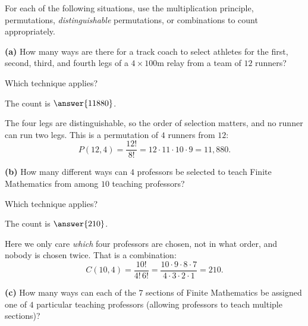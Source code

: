 \documentclass[12pt]{ximera}
\begin{document}
\begin{problem}
For each of the following situations, use the multiplication principle, permutations,
\emph{distinguishable} permutations, or combinations to count appropriately.

\begin{prompt}
\textbf{(a)} How many ways are there for a track coach to select athletes for the
first, second, third, and fourth legs of a $4\times100\text{m}$ relay from a team of
$12$ runners?

Which technique applies?
\begin{multipleChoice}
\end{multipleChoice}

The count is $\answer{11880}$.

\begin{feedback}
The four legs are distinguishable, so the order of selection matters, and no runner
can run two legs. This is a permutation of $4$ runners from $12$:
\[
P(12,4)=\frac{12!}{8!}=12\cdot 11\cdot 10\cdot 9 = 11{,}880.
\]
\end{feedback}
\end{prompt}

\begin{prompt}
\textbf{(b)} How many different ways can $4$ professors be selected to teach Finite
Mathematics from among $10$ teaching professors?

Which technique applies?
\begin{multipleChoice}
\end{multipleChoice}

The count is $\answer{210}$.

\begin{feedback}
Here we only care \emph{which} four professors are chosen, not in what order, and
nobody is chosen twice. That is a combination:
\[
C(10,4)=\frac{10!}{4!\,6!}=\frac{10\cdot 9\cdot 8\cdot 7}{4\cdot 3\cdot 2\cdot 1}=210.
\]
\end{feedback}
\end{prompt}

\begin{prompt}
\textbf{(c)} How many ways can each of the $7$ sections of Finite Mathematics be
assigned one of $4$ particular teaching professors (allowing professors to teach
multiple sections)?


\end{prompt}
\end{problem}
\end{document}
